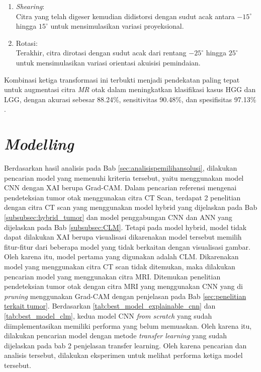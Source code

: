 \begin{enumerate}
\begin{enumerate}
		\item \textit{Shearing}: \\ Citra yang telah digeser kemudian didistorsi dengan sudut acak antara $-15^\circ$ hingga $15^\circ$ untuk mensimulasikan variasi proyeksional.
		
		\item Rotasi: \\ Terakhir, citra dirotasi dengan sudut acak dari rentang $-25^\circ$ hingga $25^\circ$ untuk mensimulasikan variasi orientasi akuisisi pemindaian. \\
	\end{enumerate}
	
	Kombinasi ketiga transformasi ini terbukti menjadi pendekatan paling tepat untuk augmentasi citra \textit{MR} otak dalam meningkatkan klasifikasi kasus HGG dan LGG, dengan akurasi sebesar 88.24\%, sensitivitas 90.48\%, dan spesifisitas 97.13\% \autocite{goceri2023medical}.
\end{enumerate}


\section{\textit{Modelling}}

Berdasarkan hasil analisis pada Bab \ref{sec:analisispemilihansolusi}, dilakukan pencarian model yang memenuhi kriteria tersebut, yaitu menggunakan model CNN dengan XAI berupa Grad-CAM. Dalam pencarian referensi mengenai pendeteksian tumor otak menggunakan citra CT Scan, terdapat 2 penelitian dengan citra CT scan yang menggunakan model hybrid yang dijelaskan pada Bab \ref{subsubsec:hybrid_tumor} dan model penggabungan CNN dan ANN yang dijelaskan pada Bab \ref{subsubsec:CLM}. Tetapi pada model hybrid, model tidak dapat dilakukan XAI berupa visualisasi dikarenakan model tersebut memilih fitur-fitur dari beberapa model yang tidak berkaitan dengan visualisasi gambar. Oleh karena itu, model pertama yang digunakan adalah CLM. Dikarenakan model yang menggunakan citra CT scan tidak ditemukan, maka dilakukan pencarian model yang menggunakan citra MRI. Ditemukan penelitian pendeteksian tumor otak dengan citra MRI yang menggunakan CNN yang di \textit{pruning} menggunakan Grad-CAM dengan penjelasan pada Bab \ref{sec:penelitian terkait tumor}. Berdasarkan \ref{tab:best_model_explainable_cnn} dan \ref{tab:best_model_clm}, kedua model CNN \textit{from scratch} yang sudah diimplementasikan memiliki performa yang belum memuaskan. Oleh karena itu, dilakukan pencarian model dengan metode \textit{transfer learning} yang sudah dijelaskan pada {bab 2 penjelasan transfer learning}. Oleh karena pencarian dan analisis tersebut, dilakukan eksperimen untuk melihat performa ketiga model tersebut.

